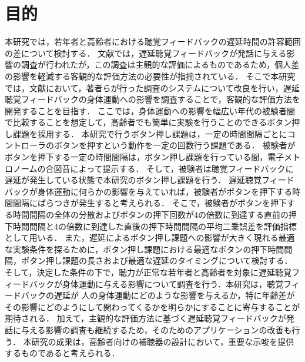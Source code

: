 \section{目的}
本研究では，若年者と高齢者における聴覚フィードバックの遅延時間の許容範囲の差について検討する．
文献\cite{kayama}では，遅延聴覚フィードバックが発話に与える影響の調査が行われたが，この調査は主観的な評価によるものであるため，個人差の影響を軽減する客観的な評価方法の必要性が指摘されている．
そこで本研究では，文献\cite{shigematu}において，著者らが行った調査のシステムについて改良を行い，遅延聴覚フィードバックの身体運動への影響を調査することで，客観的な評価方法を開発することを目指す．
ここでは，身体運動への影響を幅広い年代の被験者間で比較することを想定して，高齢者でも簡単に実験を行うことのできるボタン押し課題を採用する．
本研究で行うボタン押し課題は，一定の時間間隔ごとにコントローラのボタンを押すという動作を一定の回数行う課題である．
被験者がボタンを押下する一定の時間間隔は，ボタン押し課題を行っている間，電子メトロノームの合図音によって提示する．
そして，被験者は聴覚フィードバックに遅延が発生している状態で本研究のボタン押し課題を行う．
遅延聴覚フィードバックが身体運動に何らかの影響を与えていれば，被験者がボタンを押下する時間間隔にばらつきが発生すると考えられる．
そこで，被験者がボタンを押下する時間間隔の全体の分散およびボタンの押下回数が4の倍数に到達する直前の押下時間間隔と4の倍数に到達した直後の押下時間間隔の平均二乗誤差を評価指標として用いる．
また，遅延によるボタン押し課題への影響が大きく現れる最適な実験条件を探るために，ボタン押し課題における最適なボタンの押下時間間隔，ボタン押し課題の長さおよび最適な遅延のタイミングについて検討する．
そして，決定した条件の下で，聴力が正常な若年者と高齢者を対象に遅延聴覚フィードバックが身体運動に与える影響について調査を行う．本研究は，聴覚フィードバックの遅延が
人の身体運動にどのような影響を与えるか，特に年齢差がその影響にどのようにして関わってくるかを明らかにすることに寄与することが期待される．
加えて，主観的な評価方法に基づく遅延聴覚フィードバックが発話に与える影響の調査も継続するため，そのためのアプリケーションの改善も行う．
本研究の成果は，高齢者向けの補聴器の設計において，重要な示唆を提供するものであると考えられる．
\newpage